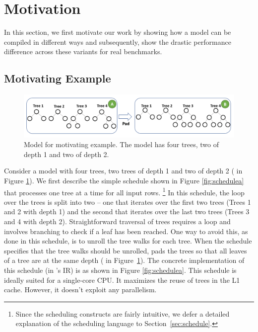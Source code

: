 \section{Motivation}
\label{sec:motivation}
In this section, we first motivate our work by showing how a model can be compiled in different ways
and subsequently, show the drastic performance difference across these variants for real benchmarks.

\subsection{Motivating Example}
\begin{figure}[htb]
  \centering
  \includegraphics[width=\linewidth]{figures/HIR.PNG}
  \caption{Model for motivating example. The model has four trees, two of depth 1 and two of depth 2.}
  \label{Fig:HIRExample}
\end{figure}

Consider a model with four trees, two 
trees of depth 1 and two of depth 2 ( in Figure \ref{Fig:HIRExample}).
We first describe the simple schedule shown in Figure \ref{fig:schedulea} that processes one tree at a time 
for all input rows. \footnote{Since the scheduling constructs are fairly intuitive, we 
defer a detailed explanation of the scheduling language to Section~\ref{sec:schedule}.} 
In this schedule, the loop over the trees is split into two -- one that
iterates over the first two trees (Trees 1 and 2 with depth 1) and 
the second that iterates over the last two trees (Trees 3 and 4 with
depth 2). Straightforward traversal of trees requires a  loop
and involves branching to check if a leaf has been reached. 
One way to avoid this, as done in this schedule, is to unroll the 
tree walks for each tree. 
When the schedule specifies that the tree walks should be unrolled, 
\Treebeard{} pads the trees so that all leaves of a tree are at the same depth
( in Figure~\ref{Fig:HIRExample}). 
The concrete implementation of this schedule (in \Treebeard{}'s IR) 
is as shown in Figure \ref{fig:schedulea}.
This schedule is ideally suited for a single-core CPU. It maximizes 
the reuse of trees in the L1 cache. However, it doesn't exploit  
any parallelism. 

